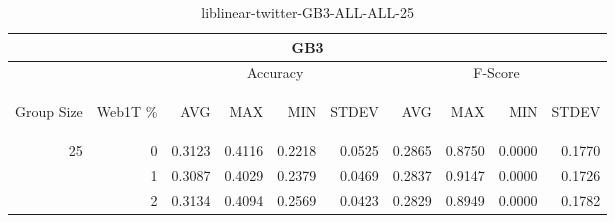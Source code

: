 \begin{center}
\begin{table}[htbp] 
 \begin{center}
\begin{tabular}{ | r | r | r | r | r | r | r | r | r | r |}
\hline
\multicolumn{10}{|c|}{GB3}\\
\hline
 & & \multicolumn{4}{|c|}{Accuracy} & \multicolumn{4}{|c|}{F-Score}\\ \cline{3-10}
\begin{sideways}Group Size\end{sideways} & \begin{sideways}Web1T \%\end{sideways} & \begin{sideways}AVG\end{sideways} & \begin{sideways}MAX\end{sideways} & \begin{sideways}MIN\end{sideways} & \begin{sideways}STDEV\end{sideways} & \begin{sideways}AVG\end{sideways} & \begin{sideways}MAX\end{sideways} & \begin{sideways}MIN\end{sideways} & \begin{sideways}STDEV\end{sideways}\\
\hline
\multirow{2}{*}{25}
 & 0 & 0.3123 & 0.4116 & 0.2218 & 0.0525 & 0.2865 & 0.8750 & 0.0000 & 0.1770\\ \cline{2-10}
 & 1 & 0.3087 & 0.4029 & 0.2379 & 0.0469 & 0.2837 & 0.9147 & 0.0000 & 0.1726\\ \cline{2-10}
 & 2 & 0.3134 & 0.4094 & 0.2569 & 0.0423 & 0.2829 & 0.8949 & 0.0000 & 0.1782\\ \cline{2-10}
\hline
\end{tabular}
\caption{liblinear-twitter-GB3-ALL-ALL-25}
\label{table:liblinear-twitter-GB3-ALL-ALL-25}
\end{center}
 \end{table}
\end{center}

